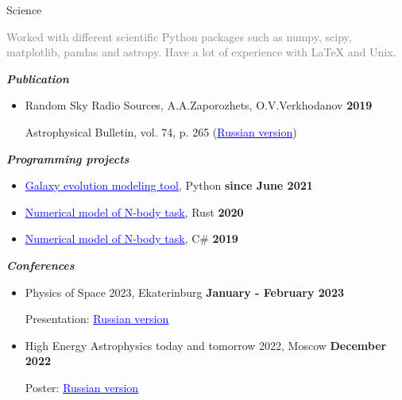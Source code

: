 \documentclass{resume} %
\newcommand{\link}[2]{\href{#1}{\textcolor{blue}{\underline{#2}}}}
\newcommand{\subheader}[1]{\textbf{\textit{#1}}}
\newcommand{\timestamp}[1]{\hfill {\small \textbf{#1}}}
\newcommand{\longversion}[1]{
\ifdefined\LONG
	#1
\fi
}
\newcommand{\note}[1]{\textcolor{gray}{#1}}
\begin{document}
	\begin{rSection}{Science}
		\longversion{
			\note{
				Worked with different scientific Python packages such as numpy, scipy, matplotlib, pandas and astropy. 
				Have a lot of experience with LaTeX and Unix.
			}
		}

		\subheader{Publication}
		\begin{itemize}
			\item Random Sky Radio Sources, A.A.Zaporozhets, O.V.Verkhodanov \timestamp{2019}
		
			Astrophysical Bulletin, vol. 74, p. 265 (\link{http://www.sao.ru/Doc-k8/Science/Public/Bulletin/Vol74/N3/ASPB265.pdf}{Russian version})
		\end{itemize}

		\vspace{1em}

		\subheader{Programming projects}
		\begin{itemize}
			\item \link{https://github.com/Kraysent/OMTool}{Galaxy evolution modeling tool}, Python \timestamp{since June 2021}
			\item \link{https://github.com/Kraysent/XBodyModel}{Numerical model of N-body task}, Rust \timestamp{2020}
			\item \link{https://github.com/Kraysent/Gravity-Model}{Numerical model of N-body task}, C\# \timestamp{2019}
		\end{itemize}

		\longversion{
			\vspace{1em}

			\subheader{Conferences}
			\begin{itemize}
				\item Physics of Space 2023, Ekaterinburg \timestamp{January - February 2023}
				
				Presentation: \link{https://www.overleaf.com/read/mnwwgvkqxdky}{Russian version}
				\item High Energy Astrophysics today and tomorrow 2022, Moscow \timestamp{December 2022}
				
				Poster: \link{https://www.overleaf.com/read/cwyptqpmdtdf}{Russian version}
			\end{itemize}
		}
	\end{rSection}
\end{document}
